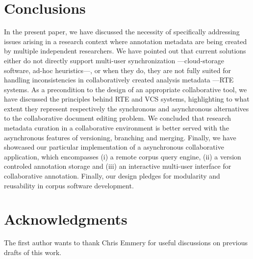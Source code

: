 \documentclass{sig-alternate}
\begin{document}
\section{Conclusions}\label{sec:conclusion}
In the present paper, we have discussed the necessity of specifically addressing issues arising
in a research context where annotation metadata are being created by multiple independent researchers.
We have pointed out that current solutions either do not directly support multi-user
synchronization ---cloud-storage software, ad-hoc heuristics---, or when they do, they are not fully
suited for handling inconsistencies in collaboratively created analysis metadata ---RTE systems.
As a precondition to the design of an appropriate collaborative tool, we have discussed the
principles behind RTE and VCS systems, highlighting to what extent they represent respectively
the synchronous and asynchronous alternatives to the collaborative document editing problem.
We concluded that research metadata curation in a collaborative environment is better served with
the asynchronous features of versioning, branching and merging.
Finally, we have showcased our particular implementation of a asynchronous collaborative application,
which encompasses (i) a remote corpus query engine, (ii) a version controled annotation storage
and (iii) an interactive multi-user interface for collaborative annotation. Finally, our design
pledges for modularity and reusability in corpus software development.

\section{Acknowledgments}
The first author wants to thank Chris Emmery for useful discussions on previous drafts of this work. 



%
%

\end{document}
